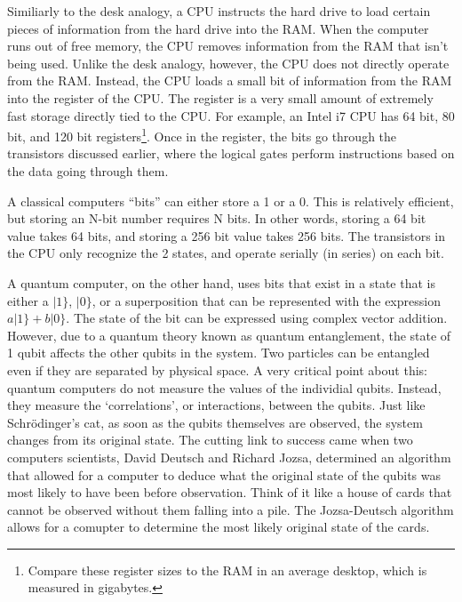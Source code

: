 \documentclass[10pt,journal,compsoc]{IEEEtran}
\begin{document}


Similiarly to the desk analogy, a CPU instructs the hard drive to load certain pieces of information from the hard drive into the RAM. When the computer runs out of free memory, the CPU removes information from the RAM that isn't being used. Unlike the desk analogy, however, the CPU does not directly operate from the RAM. Instead, the CPU loads a small bit of information from the RAM into the register of the CPU. The register is a very small amount of extremely fast storage directly tied to the CPU. For example, an Intel i7 CPU has 64 bit, 80 bit, and 120 bit registers\footnote{Compare these register sizes to the RAM in an average desktop, which is measured in gigabytes.}. Once in the register, the bits go through the transistors discussed earlier, where the logical gates perform instructions based on the data going through them. 


A classical computers ``bits'' can either store a 1 or a 0. This is relatively efficient, but storing an N-bit number requires N bits. In other words, storing a 64 bit value takes 64 bits, and storing a 256 bit value takes 256 bits. The transistors in the CPU only recognize the 2 states, and operate serially (in series) on each bit. 

A quantum computer, on the other hand, uses bits that exist in a state that is either a $|1\}$, $|0\}$, or a superposition that can be represented with the expression $a|1\} + b|0\}$. The state of the bit can be expressed using complex vector addition. However, due to a quantum theory known as quantum entanglement, the state of 1 qubit affects the other qubits in the system. Two particles can be entangled even if they are separated by physical space. A very critical point about this: quantum computers do not measure the values of the individial qubits. Instead, they measure the `correlations', or interactions, between the qubits. Just like Schr\"{o}dinger's cat, as soon as the qubits themselves are observed, the system changes from its original state. The cutting link to success came when two computers scientists, David Deutsch and Richard Jozsa, determined an algorithm that allowed for a computer to deduce what the original state of the qubits was most likely to have been before observation. Think of it like a house of cards that cannot be observed without them falling into a pile. The Jozsa-Deutsch algorithm allows for a comupter to determine the most likely original state of the cards. 
\end{document}
